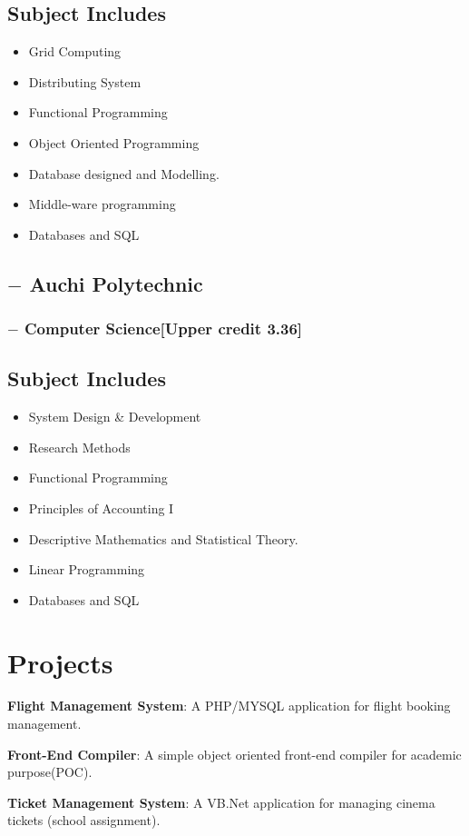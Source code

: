 \documentclass[11px]{article}
\begin{document}
\subsection*{Subject Includes}
\begin{itemize}
	\item  Grid Computing
	\item Distributing System
	\item Functional Programming
	\item Object Oriented Programming
	\item Database designed and Modelling.
	\item Middle-ware programming
	\item Databases and SQL
\end{itemize}


\subsection*{$-$ Auchi Polytechnic}
\subsubsection*{$-$ Computer Science[Upper credit 3.36] }
\subsection*{Subject Includes}
\begin{itemize}
	\item System Design \& Development
	\item  Research Methods
	\item Functional Programming
	\item Principles of Accounting I
	\item Descriptive Mathematics and Statistical Theory.
	\item Linear Programming
	\item Databases and SQL
\end{itemize}	
\hrulefill
\section*{Projects}
\textbf{Flight Management System}: A PHP/MYSQL application for flight booking management.

\textbf{Front-End Compiler}: A simple object oriented front-end compiler for academic purpose(POC).

\textbf{Ticket Management System}: A VB.Net application for managing cinema tickets (school assignment).
\end{document}
